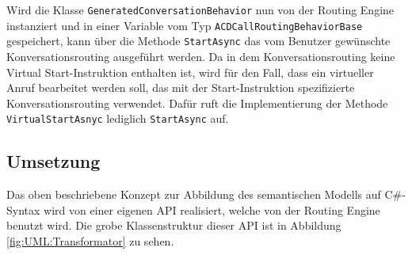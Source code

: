 \newline
Wird die Klasse \texttt{GeneratedConversationBehavior} nun von der Routing Engine instanziert und in einer Variable vom Typ \texttt{ACDCallRoutingBehaviorBase} gespeichert, kann über die Methode \texttt{StartAsync} das vom Benutzer gewünschte Konversationsrouting ausgeführt werden. Da in dem Konversationsrouting keine Virtual Start-Instruktion enthalten ist, wird für den Fall, dass ein virtueller Anruf bearbeitet werden soll, das mit der Start-Instruktion spezifizierte Konversationsrouting verwendet. Dafür ruft die Implementierung der Methode \texttt{VirtualStartAsnyc} lediglich \texttt{StartAsync} auf.

\subsection{Umsetzung}
Das oben beschriebene Konzept zur Abbildung des semantischen Modells auf C\#-Syntax wird von einer eigenen API realisiert, welche von der Routing Engine benutzt wird. Die grobe Klassenstruktur dieser API ist in Abbildung \ref{fig:UML:Transformator} zu sehen. 

